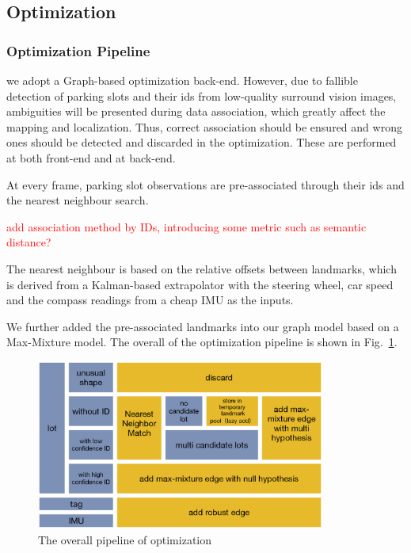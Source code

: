 \documentclass[journal]{IEEEtran}
\newcommand{\Reffig}[1]{Fig.~\ref{#1}}
\newcommand{\COMMENT}[1]{\textcolor{red}{#1}}
\begin{document}
\subsection{Optimization}
\label{sec:optimization}
\subsubsection{Optimization Pipeline}
we adopt a Graph-based optimization back-end.
However, due to fallible detection of parking slots and their ids from low-quality surround vision images, ambiguities will be presented during data association, which greatly affect the mapping and localization.
Thus, correct association should be ensured and wrong ones should be detected and discarded in the optimization.
These are performed at both front-end and at back-end.

At every frame, parking slot observations are pre-associated through their ids and the nearest neighbour search.

\COMMENT{add association method by IDs, introducing some metric such as semantic distance?}

The nearest neighbour is based on the relative offsets between landmarks, which is derived 
from a Kalman-based extrapolator with the steering wheel, car speed and the compass readings from a cheap IMU as the inputs.

%

We further added the pre-associated landmarks into our graph model based on a Max-Mixture model\citep{Pfingsthorn2014Representing}.
The overall of the optimization pipeline is shown in \Reffig{fig:5}. 

\begin{figure}
\centering
\includegraphics[height = 2.2in]{pic/fig8_Optimize}
\caption{
The overall pipeline of optimization
}\label{fig:5}
\end{figure}
\end{document}

